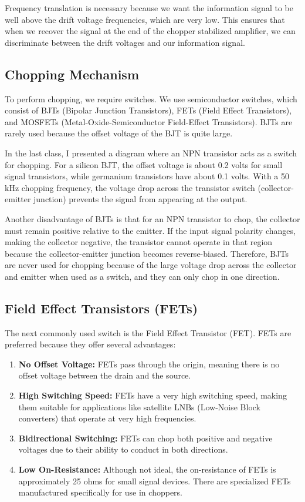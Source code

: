 Frequency translation is necessary because we want the information signal to be well above the drift voltage frequencies, which are very low. This ensures that when we recover the signal at the end of the chopper stabilized amplifier, we can discriminate between the drift voltages and our information signal.

\subsection{Chopping Mechanism}
To perform chopping, we require switches. We use semiconductor switches, which consist of BJTs (Bipolar Junction Transistors), FETs (Field Effect Transistors), and MOSFETs (Metal-Oxide-Semiconductor Field-Effect Transistors). BJTs are rarely used because the offset voltage of the BJT is quite large.

In the last class, I presented a diagram where an NPN transistor acts as a switch for chopping. For a silicon BJT, the offset voltage is about 0.2 volts for small signal transistors, while germanium transistors have about 0.1 volts. With a 50 kHz chopping frequency, the voltage drop across the transistor switch (collector-emitter junction) prevents the signal from appearing at the output.

Another disadvantage of BJTs is that for an NPN transistor to chop, the collector must remain positive relative to the emitter. If the input signal polarity changes, making the collector negative, the transistor cannot operate in that region because the collector-emitter junction becomes reverse-biased. Therefore, BJTs are never used for chopping because of the large voltage drop across the collector and emitter when used as a switch, and they can only chop in one direction.

\subsection{Field Effect Transistors (FETs)}
The next commonly used switch is the Field Effect Transistor (FET). FETs are preferred because they offer several advantages:
\begin{enumerate}
    \item \textbf{No Offset Voltage:} FETs pass through the origin, meaning there is no offset voltage between the drain and the source.
    \item \textbf{High Switching Speed:} FETs have a very high switching speed, making them suitable for applications like satellite LNBs (Low-Noise Block converters) that operate at very high frequencies.
    \item \textbf{Bidirectional Switching:} FETs can chop both positive and negative voltages due to their ability to conduct in both directions.
    \item \textbf{Low On-Resistance:} Although not ideal, the on-resistance of FETs is approximately 25 ohms for small signal devices. There are specialized FETs manufactured specifically for use in choppers.
\end{enumerate}

